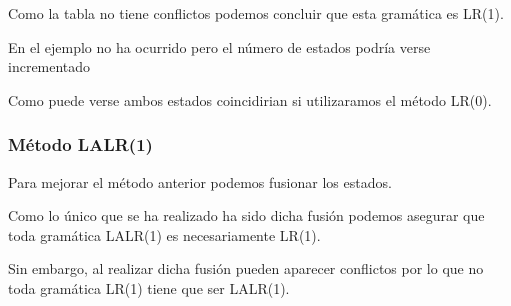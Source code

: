 \documentclass[\main/ApuntesPL.tex]{subfiles}
\begin{document}
        \par
        Como la tabla no tiene conflictos podemos concluir que esta gramática es
        LR(1).

        \bigskip
        \par
        En el ejemplo no ha ocurrido pero el número de estados podría verse
        incrementado

        \begin{center}
        \end{center}

        \par
        Como puede verse ambos estados coincidirian si utilizaramos el método
        LR(0).

      \subsubsection{Método LALR(1)}
        \par
        Para mejorar el método anterior podemos fusionar los estados.

        \begin{center}
        \end{center}

        \par
        Como lo único que se ha realizado ha sido dicha fusión podemos asegurar
        que toda gramática LALR(1) es necesariamente LR(1).

        \bigskip
        \par
        Sin embargo, al realizar dicha fusión pueden aparecer conflictos por lo
        que no toda gramática LR(1) tiene que ser LALR(1).
\end{document}
